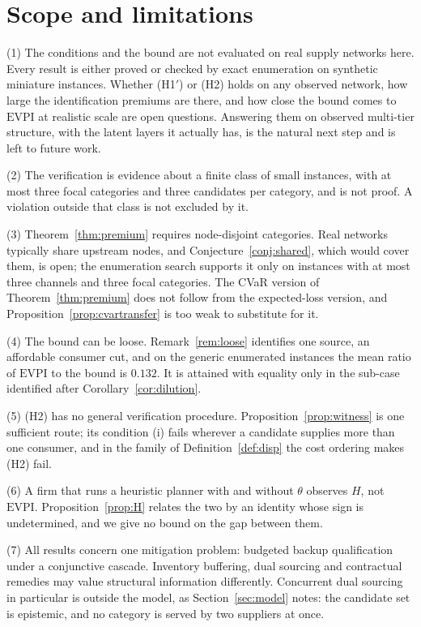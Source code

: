 \documentclass[pdflatex,sn-mathphys-num]{sn-jnl}
\theoremstyle{thmstyleone}
\theoremstyle{thmstyletwo}
\theoremstyle{thmstylethree}
\newcommand{\evpi}{\mathrm{EVPI}}
\begin{document}
\section{Scope and limitations}\label{sec:limits}

(1) The conditions and the bound are not evaluated on real supply networks
here. Every result is either proved or checked by exact enumeration on
synthetic miniature instances. Whether (H1$'$) or (H2) holds on any observed
network, how large the identification premiums are there, and how close the
bound comes to $\evpi$ at realistic scale are open questions. Answering them
on observed multi-tier structure, with the latent layers it actually has, is
the natural next step and is left to future work.

(2) The verification is evidence about a finite class of small instances,
with at most three focal categories and three candidates per category, and
is not proof. A violation outside that class is not excluded by it.

(3) Theorem~\ref{thm:premium} requires node-disjoint categories. Real
networks typically share upstream nodes, and Conjecture~\ref{conj:shared},
which would cover them, is open; the enumeration search supports it only on
instances with at most three channels and three focal categories. The CVaR
version of Theorem~\ref{thm:premium} does not follow from the expected-loss
version, and Proposition~\ref{prop:cvartransfer} is too weak to substitute
for it.

(4) The bound can be loose. Remark~\ref{rem:loose} identifies one source, an
affordable consumer cut, and on the generic enumerated instances the mean
ratio of $\evpi$ to the bound is $0.132$. It is attained with equality only
in the sub-case identified after Corollary~\ref{cor:dilution}.

(5) (H2) has no general verification procedure. Proposition~\ref{prop:witness}
is one sufficient route; its condition (i) fails wherever a candidate
supplies more than one consumer, and in the family of
Definition~\ref{def:disp} the cost ordering makes (H2) fail.

(6) A firm that runs a heuristic planner with and without $\theta$ observes
$H$, not $\evpi$. Proposition~\ref{prop:H} relates the two by an identity
whose sign is undetermined, and we give no bound on the gap between them.

(7) All results concern one mitigation problem: budgeted backup
qualification under a conjunctive cascade. Inventory buffering, dual
sourcing and contractual remedies may value structural information
differently. Concurrent dual sourcing in particular is outside the model, as
Section~\ref{sec:model} notes: the candidate set is epistemic, and no
category is served by two suppliers at once.
\end{document}
